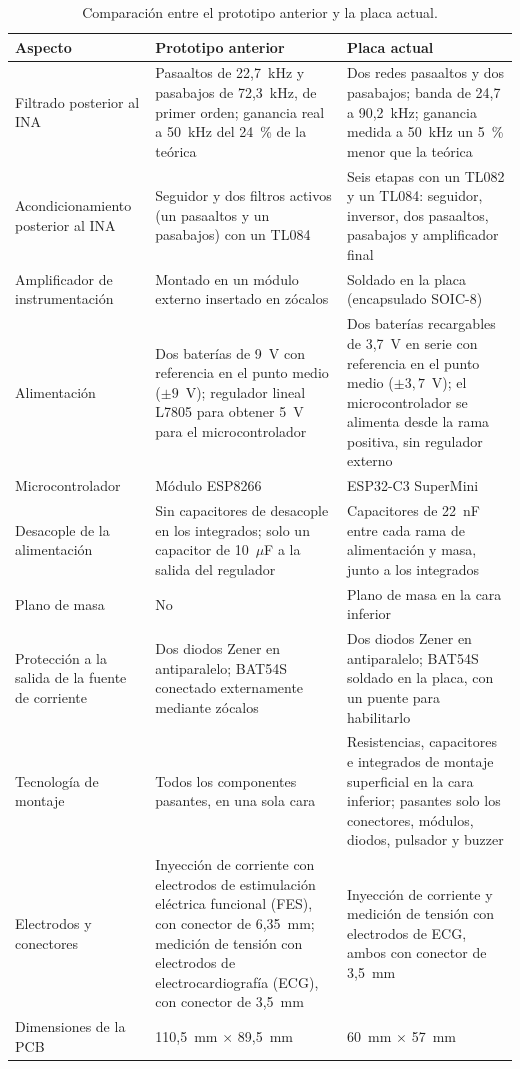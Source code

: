 \documentclass[12pt,a4paper]{article}
\begin{document}
\begin{table}[htbp]
    \centering
    \caption{Comparación entre el prototipo anterior y la placa actual.}
    \label{tab:comparacion_prototipos}
    \small
    \begin{tabular}{p{3.0cm}p{5.0cm}p{5.0cm}}
        \hline
        Aspecto & Prototipo anterior & Placa actual \\
        \hline
        Filtrado posterior al INA & Pasaaltos de 22,7~kHz y pasabajos de 72,3~kHz, de primer orden; ganancia real a 50~kHz del 24~\% de la teórica & Dos redes pasaaltos y dos pasabajos; banda de 24,7 a 90,2~kHz; ganancia medida a 50~kHz un 5~\% menor que la teórica \\
        Acondicionamiento posterior al INA & Seguidor y dos filtros activos (un pasaaltos y un pasabajos) con un TL084 & Seis etapas con un TL082 y un TL084: seguidor, inversor, dos pasaaltos, pasabajos y amplificador final \\
        Amplificador de instrumentación & Montado en un módulo externo insertado en zócalos & Soldado en la placa (encapsulado SOIC-8) \\
        Alimentación & Dos baterías de 9~V con referencia en el punto medio ($\pm9$~V); regulador lineal L7805 para obtener 5~V para el microcontrolador & Dos baterías recargables de 3,7~V en serie con referencia en el punto medio ($\pm3{,}7$~V); el microcontrolador se alimenta desde la rama positiva, sin regulador externo \\
        Microcontrolador & Módulo ESP8266 & ESP32-C3 SuperMini \\
        Desacople de la alimentación & Sin capacitores de desacople en los integrados; solo un capacitor de 10~$\mu$F a la salida del regulador & Capacitores de 22~nF entre cada rama de alimentación y masa, junto a los integrados \\
        Plano de masa & No & Plano de masa en la cara inferior \\
        Protección a la salida de la fuente de corriente & Dos diodos Zener en antiparalelo; BAT54S conectado externamente mediante zócalos & Dos diodos Zener en antiparalelo; BAT54S soldado en la placa, con un puente para habilitarlo \\
        Tecnología de montaje & Todos los componentes pasantes, en una sola cara & Resistencias, capacitores e integrados de montaje superficial en la cara inferior; pasantes solo los conectores, módulos, diodos, pulsador y buzzer \\
        Electrodos y conectores & Inyección de corriente con electrodos de estimulación eléctrica funcional (FES), con conector de 6,35~mm; medición de tensión con electrodos de electrocardiografía (ECG), con conector de 3,5~mm & Inyección de corriente y medición de tensión con electrodos de ECG, ambos con conector de 3,5~mm \\
        Dimensiones de la PCB & 110,5~mm $\times$ 89,5~mm & 60~mm $\times$ 57~mm \\
        \hline
    \end{tabular}
\end{table}
\end{document}
